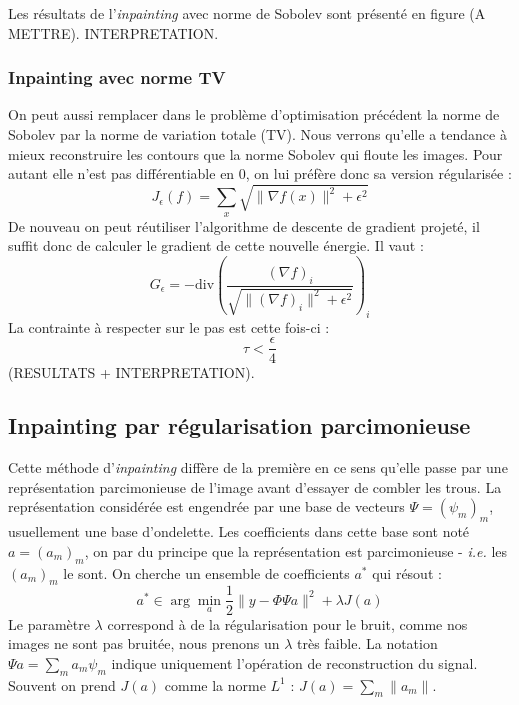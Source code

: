 Les résultats de l'\emph{inpainting} avec norme de Sobolev sont présenté en figure (A METTRE). INTERPRETATION.

 
\subsubsection{Inpainting avec norme TV}

On peut aussi remplacer dans le problème d'optimisation précédent la norme de Sobolev par la norme de variation totale (TV). Nous verrons qu'elle a tendance à mieux reconstruire les contours que la norme Sobolev qui floute les images. Pour autant elle n'est pas différentiable en 0, on lui préfère donc sa version régularisée :
\begin{equation}
J_{\epsilon}(f) = \sum_x \sqrt{\|\nabla f(x) \|^2 + \epsilon^2}
\end{equation}
De nouveau on peut réutiliser l'algorithme de descente de gradient projeté, il suffit donc de calculer le gradient de cette nouvelle énergie. Il vaut : 
\begin{equation}
G_{\epsilon} = - \text{div} \left( \frac{(\nabla f)_i}{\sqrt{\| (\nabla f)_i \|^2 + \epsilon^2}}\right)_i
\end{equation}
La contrainte à respecter sur le pas est cette fois-ci :
\begin{equation}
\tau < \frac{\epsilon}{4}
\end{equation}
(RESULTATS + INTERPRETATION).


\subsection{Inpainting par régularisation parcimonieuse}

Cette méthode d'\emph{inpainting} diffère de la première en ce sens qu'elle passe par une représentation parcimonieuse de l'image avant d'essayer de combler les trous. La représentation considérée est engendrée par une base de vecteurs $\Psi = (\psi_m)_m$, usuellement une base d'ondelette. Les coefficients dans cette base sont noté $a =(a_m)_m$, on par du principe que la représentation est parcimonieuse - \emph{i.e.} les $(a_m)_m$ le sont. On cherche un ensemble de coefficients $a^*$ qui résout :
\begin{equation}
a^* \in \arg \min_a \frac{1}{2} \| y - \Phi \Psi a \|^2 + \lambda J(a)
\end{equation}
Le paramètre $\lambda$ correspond à de la régularisation pour le bruit, comme nos images ne sont pas bruitée, nous prenons un $\lambda$ très faible. La notation $\Psi a = \sum_m a_m \psi_m$ indique uniquement l'opération de reconstruction du signal. Souvent on prend $J(a)$ comme la norme $L^1$ : $J(a) = \sum_m \|a_m \|$.

